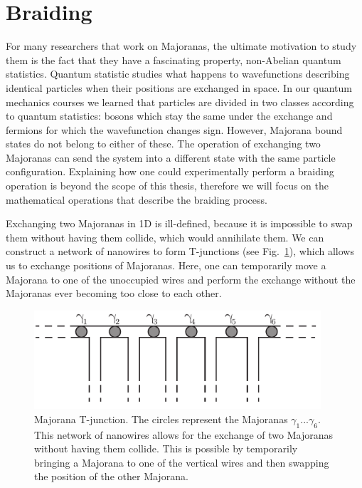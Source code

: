 \section{\label{sec:braiding}Braiding}

For many researchers that work on Majoranas, the ultimate motivation to study them is the fact that they have a fascinating property, non-Abelian quantum statistics.
Quantum statistic studies what happens to wavefunctions describing identical particles when their positions are exchanged in space.
In our quantum mechanics courses we learned that particles are divided in two classes according to quantum statistics: bosons which stay the same under the exchange and fermions for which the wavefunction changes sign.
However, Majorana bound states do not belong to either of these.
The operation of exchanging two Majoranas can send the system into a different state with the same particle configuration.
Explaining how one could experimentally perform a braiding operation is beyond the scope of this thesis, therefore we will focus on the mathematical operations that describe the braiding process.

Exchanging two Majoranas in 1D is ill-defined, because it is impossible to swap them without having them collide, which would annihilate them.
We can construct a network of nanowires to form T-junctions (see Fig.~\ref{fig:Majorana-T-junction}), which allows us to exchange positions of Majoranas.
Here, one can temporarily move a Majorana to one of the unoccupied wires and perform the exchange without the Majoranas ever becoming too close to each other.

\begin{figure}
\begin{centering}
\includegraphics[width=0.95\textwidth]{chapter_introduction/figures/T-junction-network.pdf}
\par\end{centering}
\centering{}
\caption{Majorana T-junction.
The circles represent the Majoranas $\gamma_{1}...\gamma_{6}$.
This network of nanowires allows for the exchange of two Majoranas without having them collide.
This is possible by temporarily bringing a Majorana to one of the
vertical wires and then swapping the position of the other Majorana.
\label{fig:Majorana-T-junction}}
\end{figure}

